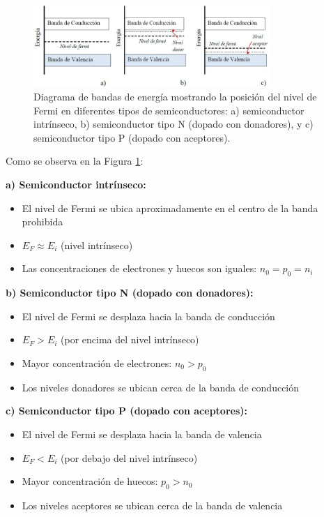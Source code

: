 \documentclass[
  11pt,
  letterpaper,
   addpoints,
  ]{exam}
\begin{document}
\begin{questions}
\begin{solution}
\begin{figure}[H]
    \centering
    \includegraphics[width=0.8\textwidth]{../figures/Auxiliar_2_5}
    \caption{Diagrama de bandas de energía mostrando la posición del nivel de Fermi en diferentes tipos de semiconductores: a) semiconductor intrínseco, b) semiconductor tipo N (dopado con donadores), y c) semiconductor tipo P (dopado con aceptores).}
    \label{fig:fermi}
\end{figure}
Como se observa en la Figura \ref{fig:fermi}:

\textbf{a) Semiconductor intrínseco:}
\begin{itemize}
    \item El nivel de Fermi se ubica aproximadamente en el centro de la banda prohibida
    \item $E_F \approx E_i$ (nivel intrínseco)
    \item Las concentraciones de electrones y huecos son iguales: $n_0 = p_0 = n_i$
\end{itemize}

\textbf{b) Semiconductor tipo N (dopado con donadores):}
\begin{itemize}
    \item El nivel de Fermi se desplaza hacia la banda de conducción
    \item $E_F > E_i$ (por encima del nivel intrínseco)
    \item Mayor concentración de electrones: $n_0 > p_0$
    \item Los niveles donadores se ubican cerca de la banda de conducción
\end{itemize}

\textbf{c) Semiconductor tipo P (dopado con aceptores):}
\begin{itemize}
    \item El nivel de Fermi se desplaza hacia la banda de valencia
    \item $E_F < E_i$ (por debajo del nivel intrínseco)
    \item Mayor concentración de huecos: $p_0 > n_0$
    \item Los niveles aceptores se ubican cerca de la banda de valencia
\end{itemize}


\end{solution}
\end{questions}
\end{document}

